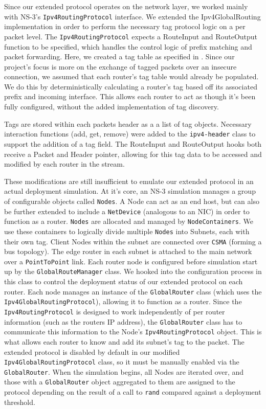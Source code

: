 \documentclass[12pt]{article} %
\newcommand{\prettycode}[1]
{\lstinline[basicstyle=\ttfamily]{#1}}
\begin{document}
Since our extended protocol operates on the network layer, we worked mainly with NS-3's \prettycode{Ipv4RoutingProtocol} interface. We extended the Ipv4GlobalRouting implementation in order to perform the necessary tag protocol logic on a per packet level. The \prettycode{Ipv4RoutingProtocol} expects a RouteInput and RouteOutput function to be specified, which handles the control logic of prefix matching and packet forwarding. Here, we created a tag table as specified in \cite{Shue20081567}. Since our project's focus is more on the exchange of tagged packets over an insecure connection, we assumed that each router's tag table would already be populated. We do this by deterministically calculating a router's tag based off its associated prefix and incoming interface. This allows each router to act as though it's been fully configured, without the added implementation of tag discovery. 

Tags are stored within each packets header as a a list of tag objects. Necessary interaction functions (add, get, remove) were added to the \prettycode{ipv4-header} class to support the addition of a tag field. The RouteInput and RouteOutput hooks both receive a Packet and Header pointer, allowing for this tag data to be accessed and modified by each router in the stream. 

These modifications are still insufficient to emulate our extended protocol in an actual deployment simulation. At it's core, an NS-3 simulation manages a group of configurable objects called \prettycode{Nodes}. A Node can act as an end host, but can also be further extended to include a \prettycode{NetDevice} (analogous to an NIC) in order to function as a router. \prettycode{Nodes} are allocated and managed by \prettycode{NodeContainers}. We use these containers to logically divide multiple \prettycode{Nodes} into Subnets, each with their own tag. Client Nodes within the subnet are connected over \prettycode{CSMA} (forming a bus topology). The edge router in each subnet is attached to the main network over a \prettycode{PointToPoint} link. Each router node is configured before simulation start up by the \prettycode{GlobalRouteManager} class. We hooked into the configuration process in this class to control the deployment status of our extended protocol on each router. Each node manages an instance of the \prettycode{GlobalRouter} class (which uses the \prettycode{Ipv4GlobalRoutingProtocol}), allowing it to function as a router. Since the \prettycode{Ipv4RoutingProtocol} is designed to work independently of per router information (such as the routers IP address), the \prettycode{GlobalRouter} class has to communicate this information to the Node's \prettycode{Ipv4RoutingProtocol} object. This is what allows each router to know and add its subnet's tag to the packet. The extended protocol is disabled by default in our modified \prettycode{Ipv4GlobalRoutingProtocol} class, so it must be manually enabled via the \prettycode{GlobalRouter}. When the simulation begins, all Nodes are iterated over, and those with a \prettycode{GlobalRouter} object aggregated to them are assigned to the protocol depending on the result of a call to \prettycode{rand} compared against a deployment threshold.
\end{document}
